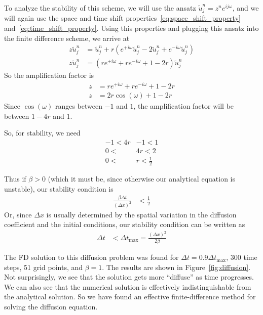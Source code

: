 \documentclass[twocolumn]{myarticle}
\begin{document}
To analyze the stability of this scheme, we will use the ansatz $ \tilde{u}^n_j = z^n e^{i j \omega} $, and we will again use the space and time shift properties~\eqref{eq:space_shift_property} and~\eqref{eq:time_shift_property}.
Using this properties and plugging this ansatz into the finite difference scheme, we arrive at
\begin{align}
    z \tilde{u}^n_j &= \tilde{u}^n_j + r \left( e^{+i \omega} \tilde{u}^n_j - 2 \tilde{u}^n_j + e^{-i\omega} \tilde{u}^n_j \right)
    \\
    z \tilde{u}^n_j &= \left( r e^{+i\omega} + r e^{-i\omega} + 1 - 2 r \right) \tilde{u}^n_j
\end{align}
So the amplification factor is
\begin{align}
    z &= r e^{+i\omega} + r e^{-i\omega} + 1 - 2 r
    \\
    z &= 2 r \cos(\omega) + 1 - 2 r
\end{align}
Since $ \cos(\omega) $ ranges between $ -1 $ and $ 1 $, the amplification factor will be between $ 1 - 4r $ and $ 1 $.

So, for stability, we need
\begin{align}
    -1 < 4r &- 1 < 1
    \\
    0 < &4r < 2
    \\
    0 < &r < \frac{1}{2}
\end{align}

Thus if $ \beta > 0 $ (which it must be, since otherwise our analytical equation is unstable), our stability condition is
\begin{align}
    \frac{\beta \Delta t}{(\Delta x)^2} &< \frac{1}{2}
\end{align}
Or, since $ \Delta x $ is usually determined by the spatial variation in the diffusion coefficient and the initial conditions, our stability condition can be written as
\begin{align}
    \Delta t &< \Delta t_\text{max} = \frac{(\Delta x)^2}{2 \beta}
\end{align}

The FD solution to this diffusion problem was found for $ \Delta t = 0.9 \Delta t_\text{max} $, 300 time steps, 51 grid points, and $ \beta = 1 $.
The results are shown in Figure~\ref{fig:diffusion}.
Not surprisingly, we see that the solution gets more ``diffuse'' as time progresses.
We can also see that the numerical solution is effectively indistinguishable from the analytical solution.
So we have found an effective finite-difference method for solving the diffusion equation.
\end{document}
